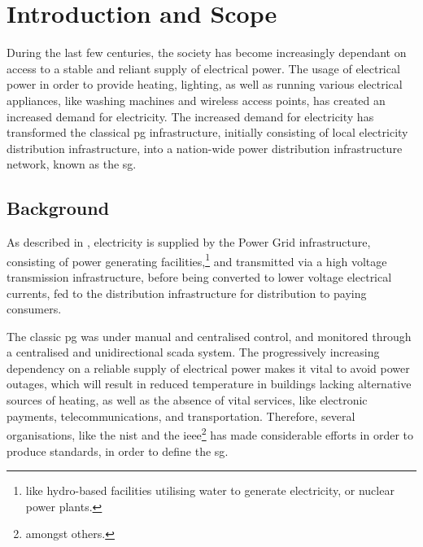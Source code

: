 
\chapter{Introduction and Scope} 


During the last few centuries, the society  has become increasingly dependant on access to a stable and reliant supply of electrical power. The usage of electrical power in order to provide heating, lighting, as well as running various electrical appliances, like washing machines and wireless access points, has created an increased demand for electricity. The increased demand for electricity has transformed the classical \acrfull{pg} infrastructure, initially consisting of local electricity distribution infrastructure,  into a nation-wide power distribution infrastructure network, known as the \acrfull{sg}.







\section{Background}
As described in \cite{BlumeStevenW2007Epsb}, electricity is supplied by the Power Grid infrastructure, consisting of power generating facilities,\footnote{like hydro-based facilities utilising water to generate electricity, or nuclear power plants.} and transmitted via a high voltage transmission infrastructure, before being converted to  lower voltage electrical currents, fed to the distribution infrastructure for distribution to paying consumers.


The classic \acrlong{pg} was under manual and centralised control, and monitored through a centralised and unidirectional \acrfull{scada} system.
The progressively increasing dependency on a reliable supply of electrical power makes it vital to avoid power outages, which will result in reduced temperature in buildings lacking alternative sources of heating, as well as the absence of vital services, like electronic payments, telecommunications, and transportation.
Therefore, several organisations, like the \acrfull{nist} and the \acrfull{ieee}\footnote{amongst others.} has made considerable efforts in order to produce standards, in order to define the \acrlong{sg}.


